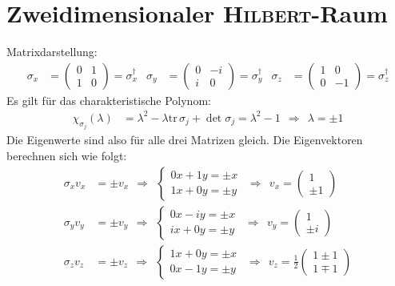 \documentclass[a4paper,12pt]{article}
\begin{document}
\section{Zweidimensionaler \textsc{Hilbert}-Raum}
Matrixdarstellung:
\begin{align*}
\sigma_x&=\begin{pmatrix}
0&1\\ 1&0
\end{pmatrix}=\sigma_x^\dagger &\sigma_y&=\begin{pmatrix}
0&-i\\ i&0
\end{pmatrix}=\sigma_y^\dagger &\sigma_z &=\begin{pmatrix}
1&0\\ 0&-1
\end{pmatrix}=\sigma_z^\dagger
\end{align*}
Es gilt für das charakteristische Polynom:
\begin{align*}
\chi_{\sigma_j}(\lambda)&=\lambda^2-\lambda\mathrm{tr\,}\sigma_j+\det\sigma_j=\lambda^2-1\ \ \Rightarrow\ \ \lambda=\pm 1
\end{align*}
Die Eigenwerte sind also für alle drei Matrizen gleich. Die Eigenvektoren berechnen sich wie folgt:
\begin{align*}
\sigma_xv_x&=\pm v_x\ \ \Rightarrow\ \ \left\{\begin{matrix}
0x + 1y = \pm x \\ 1x + 0y = \pm y
\end{matrix}\right.\ \ \Rightarrow\ \ v_x=\begin{pmatrix}
1 \\ \pm 1
\end{pmatrix} \\
\sigma_yv_y&=\pm v_y\ \ \Rightarrow\ \ \left\{\begin{matrix}
0x - iy = \pm x \\ ix + 0y = \pm y
\end{matrix}\right.\ \ \Rightarrow\ \ v_y=\begin{pmatrix}
1 \\ \pm i
\end{pmatrix} \\
\sigma_zv_z&=\pm v_z\ \ \Rightarrow\ \ \left\{\begin{matrix}
1x + 0y = \pm x \\ 0x - 1y = \pm y
\end{matrix}\right.\ \ \Rightarrow\ \ v_z=\frac{1}{2}\begin{pmatrix}
1\pm 1 \\  1\mp 1
\end{pmatrix}
\end{align*}
\end{document}
